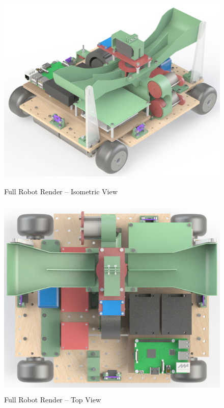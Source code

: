 \begin{figure}[H]   %
	\centering \includegraphics[width=6in, height=3.85in, keepaspectratio]{figures/render_isometric.png}
	\caption{Full Robot Render -- Isometric View}\label{fig:render_isometric}
\end{figure}
\begin{figure}[H]   %
	\centering \includegraphics[width=6in, height=3.85in, keepaspectratio]{figures/render_top.png}
	\caption{Full Robot Render -- Top View}	\label{fig:render_top}
\end{figure}
